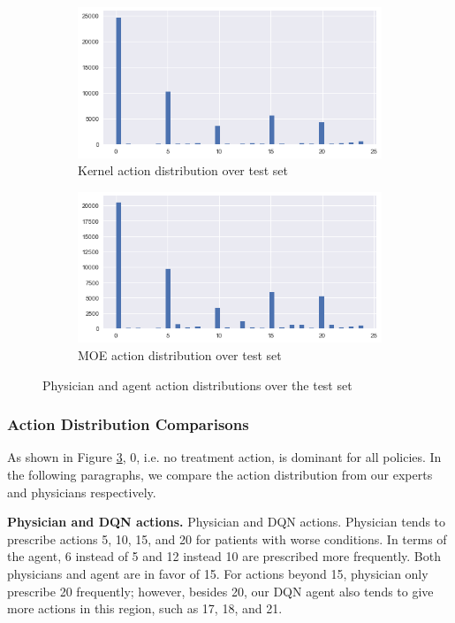 \documentclass[letterpaper]{article}
\begin{document}
\begin{figure}[H]
  \begin{subfigure}{0.48\linewidth}
  \centering
  \includegraphics[width=0.9\linewidth]{figures/Kernel_test_bar.png}\hfill
  \caption{Kernel action distribution over test set}
  \label{fig:kenel_test_bar}
  \end{subfigure}
  \begin{subfigure}{0.48\linewidth}
  \centering
  \includegraphics[width=0.9\linewidth]{figures/MOE_test_bar.png}\hfill
  \caption{MOE action distribution over test set}
  \label{fig:MOE_test_bar}
  \end{subfigure}
  \caption{Physician and agent action distributions over the test set}
  \label{fig:test_a_hist}
\end{figure}

\subsubsection{Action Distribution Comparisons}

As shown in Figure \ref{fig:test_a_hist}, 0, i.e. no treatment action, is dominant for all policies. In the following paragraphs, we compare the action distribution from our experts and physicians respectively. 

\textbf{Physician and DQN actions.}
Physician and DQN actions. Physician tends to prescribe actions 5, 10, 15, and 20 for patients with worse conditions. In terms of the agent, 6 instead of 5 and 12 instead 10 are prescribed more frequently. Both physicians and agent are in favor of 15. For actions beyond 15, physician only prescribe 20 frequently; however, besides 20, our DQN agent also tends to give more actions in this region, such as 17, 18, and 21.
\end{document}
